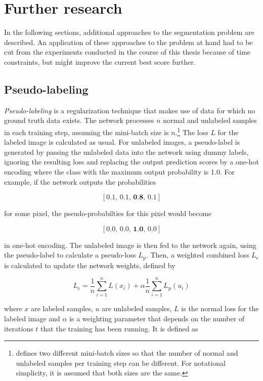 \chapter {Further research}
\label{chap:futurework}

In the following sections, additional approaches to the segmentation problem are described. An application of these approaches to the problem at hand had to be cut from the experiments conducted in the course of this thesis because of time constraints, but might improve the current best score further.


	\section {Pseudo-labeling}
\label{subsec:pseudo_label}

\textit{Pseudo-labeling} \cite{pseudo_label} is a regularization technique that makes use of data for which no ground truth data exists. The network processes $n$ normal and unlabeled samples in each training step, assuming the mini-batch size is $n$.\footnote{\cite{pseudo_label} defines two different mini-batch sizes so that the number of normal and unlabeled samples per training step can be different. For notational simplicity, it is assumed that both sizes are the same.} The loss $L$ for the labeled image is calculated as usual. For unlabeled images, a pseudo-label is generated by passing the unlabeled data into the network using dummy labels, ignoring the resulting loss and replacing the output prediction scores by a one-hot encoding where the class with the maximum output probability is 1.0. For example, if the network outputs the probabilities 

\[ [0.1,\, 0.1,\, \textbf{0.8},\, 0.1] \]

\noindent for some pixel, the pseudo-probabilties for this pixel would become

\[ [0.0,\, 0.0,\, \textbf{1.0},\, 0.0] \]

\noindent in one-hot encoding. The unlabeled image is then fed to the network again, using the pseudo-label to calculate a pseudo-loss $L_\text{p}$. Then, a weighted combined loss $L_\text{c}$ is calculated to update the network weights, defined by

\[ L_\text{c} = \frac{1}{n} \sum \limits_{i=1}^{n} L(x_i) + \alpha \frac{1}{n} \sum \limits_{i=1}^{n} L_\text{p}(u_i)  \]

\noindent where $x$ are labeled samples, $u$ are unlabeled samples, $L$ is the normal loss for the labeled image and $\alpha$ is a weighting parameter that depends on the number of iterations $t$ that the training has been running. It is defined as

